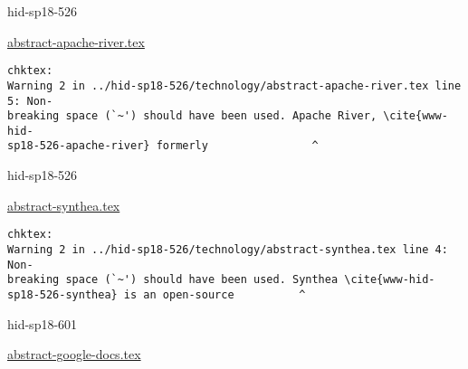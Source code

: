 

\begin{IU}

hid-sp18-526

\href{https://github.com/cloudmesh-community/hid-sp18-526/blob/master//technology/abstract-apache-river.tex}{abstract-apache-river.tex}

\begin{tiny}
\begin{verbatim}
chktex:
Warning 2 in ../hid-sp18-526/technology/abstract-apache-river.tex line 5: Non-
breaking space (`~') should have been used. Apache River, \cite{www-hid-
sp18-526-apache-river} formerly                ^
\end{verbatim}
\end{tiny}
\end{IU}



\begin{IU}

hid-sp18-526

\href{https://github.com/cloudmesh-community/hid-sp18-526/blob/master//technology/abstract-synthea.tex}{abstract-synthea.tex}

\begin{tiny}
\begin{verbatim}
chktex:
Warning 2 in ../hid-sp18-526/technology/abstract-synthea.tex line 4: Non-
breaking space (`~') should have been used. Synthea \cite{www-hid-
sp18-526-synthea} is an open-source          ^
\end{verbatim}
\end{tiny}
\end{IU}



\begin{IU}

hid-sp18-601

\href{https://github.com/cloudmesh-community/hid-sp18-601/blob/master//technology/abstract-google-docs.tex}{abstract-google-docs.tex}

\begin{tiny}
\begin{verbatim}
\end{verbatim}
\end{tiny}
\end{IU}



